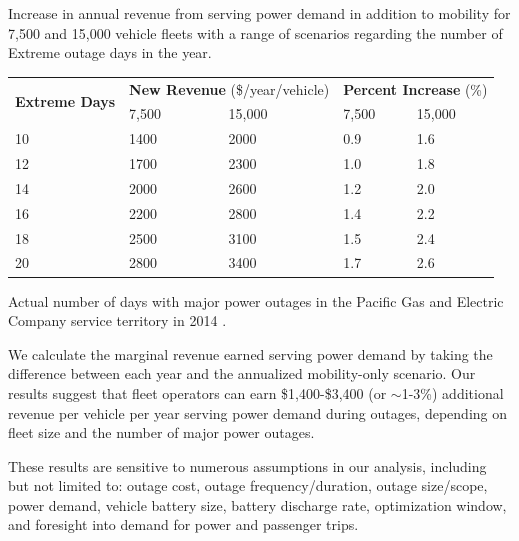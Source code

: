 \documentclass[conference]{IEEEtran}
\begin{document}
\begin{threeparttable}
    \renewcommand{\arraystretch}{1}
    \caption{Increase in annual revenue from serving power demand in addition to mobility for 7,500 and 15,000 vehicle fleets with a range of scenarios regarding the number of Extreme outage days in the year.}
    \label{tab:annual_scenarios}
    \centering
    \def\colmargin{6.75cm}
    \footnotesize{
    \begin{tabular}{p{1cm}p{1cm}p{1cm}p{1cm}p{1cm}}
    \hline
    \multirow{2}{1cm}{\textbf{Extreme Days}} & \multicolumn{2}{c}{\textbf{New Revenue} (\$/year/vehicle)} & \multicolumn{2}{c}{\textbf{Percent Increase} (\%)} \\
    &7,500 & 15,000 & 7,500 & 15,000 \\
    \hline
    10 & 1400 & 2000 & 0.9 & 1.6 \\
    12 & 1700 & 2300 & 1.0 & 1.8 \\
    14 & 2000 & 2600 & 1.2 & 2.0 \\
    16\tnote{\textasteriskcentered} & 2200 & 2800 & 1.4 & 2.2 \\
    18 & 2500 & 3100 & 1.5 & 2.4 \\
    20 & 2800 & 3400 & 1.7 & 2.6 \\
    \hline
    \end{tabular}
      \begin{tablenotes}
        \footnotesize
        \item[\textasteriskcentered] Actual number of days with major power outages in the Pacific Gas and Electric Company service territory in 2014 \cite{pge_reliability_2014}.
      \end{tablenotes}}
\end{threeparttable}

We calculate the marginal revenue earned serving power demand by taking the difference between each year and the annualized mobility-only scenario. Our results suggest that fleet operators can earn \$1,400-\$3,400 (or $\sim$1-3\%) additional revenue per vehicle per year serving power demand during outages, depending on fleet size and the number of major power outages.

These results are sensitive to numerous assumptions in our analysis, including but not limited to: outage cost, outage frequency/duration, outage size/scope, power demand, vehicle battery size, battery discharge rate, optimization window, and foresight into demand for power and passenger trips.
\end{document}
